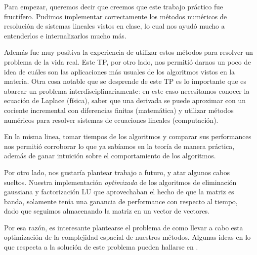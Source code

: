 Para empezar, queremos decir que creemos que este trabajo práctico fue fructífero. Pudimos implementar correctamente los métodos numéricos de resolución de sistemas lineales vistos en clase, lo cual nos ayudó mucho a entenderlos e internalizarlos mucho más.

Además fue muy positiva la experiencia de utilizar estos métodos para resolver un problema de la vida real. Este TP, por otro lado, nos permitió darnos un poco de idea de cuáles son las aplicaciones más usuales de los algoritmos vistos en la materia. Otra cosa notable que se desprende de este TP es lo importante que es abarcar un problema interdisciplinariamente: en este caso necesitamos conocer la ecuación de Laplace (física), saber que una derivada se puede aproximar con un cociente incremental con diferencias finitas (matemática) y utilizar métodos numéricos para resolver sistemas de ecuaciones lineales (computación).

En la misma linea, tomar tiempos de los algoritmos y comparar sus performances nos permitió corroborar lo que ya sabíamos en la teoría de manera práctica, además de ganar intuición sobre el comportamiento de los algoritmos.

Por otro lado, nos gustaría plantear trabajo a futuro, y atar algunos cabos sueltos. Nuestra implementación \emph{optimizada} de los algoritmos de eliminación gaussiana y factorización LU que aprovechaban el hecho de que la matriz es banda, solamente tenía una ganancia de performance con respecto al tiempo, dado que seguimos almacenando la matriz en un vector de vectores.

Por esa razón, es interesante plantearse el problema de como llevar a cabo esta optimización de la complejidad espacial de nuestros métodos. Algunas ideas en lo que respecta a la solución de este problema pueden hallarse en \cite[Cap. 4.3]{golub}. 




